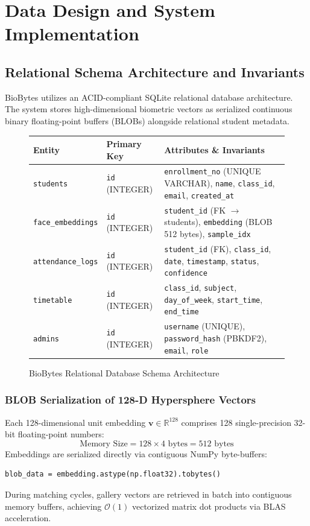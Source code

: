 \chapter{Data Design and System Implementation}

\section{Relational Schema Architecture and Invariants}
BioBytes utilizes an ACID-compliant SQLite relational database architecture. The system stores high-dimensional biometric vectors as serialized continuous binary floating-point buffers (BLOBs) alongside relational student metadata.

\begin{figure}[htbp]
\centering
\small
\renewcommand{\arraystretch}{1.2}
\begin{tabular}{|l|l|p{8.5cm}|}
\hline
\textbf{Entity} & \textbf{Primary Key} & \textbf{Attributes \& Invariants} \\
\hline
\texttt{students} & \texttt{id} (INTEGER) & \texttt{enrollment\_no} (UNIQUE VARCHAR), \texttt{name}, \texttt{class\_id}, \texttt{email}, \texttt{created\_at} \\
\texttt{face\_embeddings} & \texttt{id} (INTEGER) & \texttt{student\_id} (FK $\to$ students), \texttt{embedding} (BLOB 512 bytes), \texttt{sample\_idx} \\
\texttt{attendance\_logs} & \texttt{id} (INTEGER) & \texttt{student\_id} (FK), \texttt{class\_id}, \texttt{date}, \texttt{timestamp}, \texttt{status}, \texttt{confidence} \\
\texttt{timetable} & \texttt{id} (INTEGER) & \texttt{class\_id}, \texttt{subject}, \texttt{day\_of\_week}, \texttt{start\_time}, \texttt{end\_time} \\
\texttt{admins} & \texttt{id} (INTEGER) & \texttt{username} (UNIQUE), \texttt{password\_hash} (PBKDF2), \texttt{email}, \texttt{role} \\
\hline
\end{tabular}
\caption{BioBytes Relational Database Schema Architecture}
\label{fig:schema_table}
\end{figure}

\subsection{BLOB Serialization of 128-D Hypersphere Vectors}
Each 128-dimensional unit embedding $\mathbf{v} \in \mathbb{R}^{128}$ comprises 128 single-precision 32-bit floating-point numbers:
\begin{equation}
\text{Memory Size} = 128 \times 4\text{ bytes} = 512\text{ bytes}
\end{equation}
Embeddings are serialized directly via contiguous NumPy byte-buffers:
\begin{verbatim}
blob_data = embedding.astype(np.float32).tobytes()
\end{verbatim}
During matching cycles, gallery vectors are retrieved in batch into contiguous memory buffers, achieving $\mathcal{O}(1)$ vectorized matrix dot products via BLAS acceleration.

